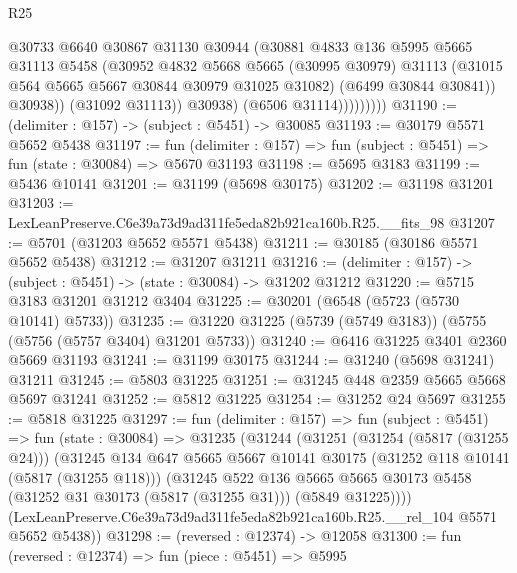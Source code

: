 \begin{lexlean}{R25}
\begin{coremodule}
                          @30733
                          @6640
                          @30867
                          @31130
                          @30944
                          (@30881
                            @4833
                            @136
                            @5995
                            @5665
                            @31113
                            @5458
                            (@30952
                              @4832
                              @5668
                              @5665
                              (@30995 @30979)
                              @31113
                              (@31015 @564 @5665 @5667 @30844 @30979 @31025 @31082)
                              (@6499 @30844 @30841))
                            @30938))
                        (@31092 @31113))
                      @30938)
                    (@6506 @31114)))))))))
@31190 := (delimiter : @157) -> (subject : @5451) -> @30085
@31193 := @30179 @5571 @5652 @5438
@31197 := fun (delimiter : @157) => fun (subject : @5451) => fun (state : @30084) => @5670 @31193
@31198 := @5695 @3183
@31199 := @5436 @10141
@31201 := @31199 (@5698 @30175)
@31202 := @31198 @31201
@31203 := LexLeanPreserve.C6e39a73d9ad311fe5eda82b921ca160b.R25.__fits_98
@31207 := @5701 (@31203 @5652 @5571 @5438)
@31211 := @30185 (@30186 @5571 @5652 @5438)
@31212 := @31207 @31211
@31216 := (delimiter : @157) -> (subject : @5451) -> (state : @30084) -> @31202 @31212
@31220 := @5715 @3183 @31201 @31212 @3404
@31225 := @30201 (@6548 (@5723 (@5730 @10141) @5733))
@31235 := @31220 @31225 (@5739 (@5749 @3183)) (@5755 (@5756 (@5757 @3404) @31201 @5733))
@31240 := @6416 @31225 @3401 @2360 @5669 @31193
@31241 := @31199 @30175
@31244 := @31240 (@5698 @31241) @31211
@31245 := @5803 @31225
@31251 := @31245 @448 @2359 @5665 @5668 @5697 @31241
@31252 := @5812 @31225
@31254 := @31252 @24 @5697
@31255 := @5818 @31225
@31297 := fun (delimiter : @157) =>
  fun (subject : @5451) =>
  fun (state : @30084) =>
  @31235
    (@31244
      (@31251
        (@31254 (@5817 (@31255 @24)))
        (@31245
          @134
          @647
          @5665
          @5667
          @10141
          @30175
          (@31252 @118 @10141 (@5817 (@31255 @118)))
          (@31245
            @522
            @136
            @5665
            @5665
            @30173
            @5458
            (@31252 @31 @30173 (@5817 (@31255 @31)))
            (@5849 @31225))))
      (LexLeanPreserve.C6e39a73d9ad311fe5eda82b921ca160b.R25.__rel_104 @5571 @5652 @5438))
@31298 := (reversed : @12374) -> @12058
@31300 := fun (reversed : @12374) => fun (piece : @5451) => @5995

\end{coremodule}
\end{lexlean}
